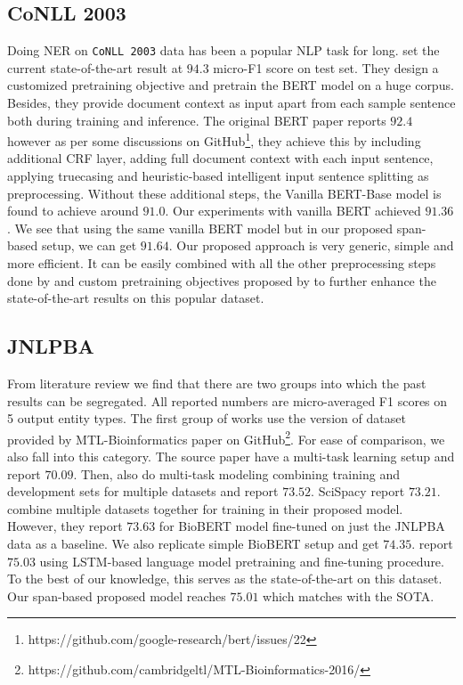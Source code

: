 \subsection{CoNLL 2003}
Doing NER on \texttt{CoNLL 2003} data has been a popular NLP task for long. \cite{yamada2020luke} set the current state-of-the-art result at $94.3$ micro-F1 score on test  set. They design a customized pretraining objective and pretrain the BERT model on a huge corpus. Besides, they provide document context as input apart from each sample sentence both during training and inference. The original BERT paper\cite{devlin2018bert} reports $92.4$ however as per some discussions on GitHub\footnote{https://github.com/google-research/bert/issues/22}, they achieve this by including additional CRF layer, adding full document context with each input sentence, applying truecasing and heuristic-based intelligent input sentence splitting as preprocessing. Without these additional steps, the Vanilla BERT-Base model is found to achieve around $91.0$. Our experiments with vanilla BERT achieved $91.36$. We see that using the same vanilla BERT model but in our proposed span-based setup, we can get $91.64$. Our proposed approach is very generic, simple and more efficient. It can be easily combined with all the other preprocessing steps done by \cite{devlin2018bert} and custom pretraining objectives proposed by \cite{yamada2020luke} to further enhance the state-of-the-art results on this popular dataset.

\subsection{JNLPBA}
From literature review we find that there are two groups into which the past results can be segregated. All reported numbers are micro-averaged F1 scores on 5 output entity types. The first group of works use the version of dataset provided by MTL-Bioinformatics\cite{crichton2017neural} paper on GitHub\footnote{https://github.com/cambridgeltl/MTL-Bioinformatics-2016/}. For ease of comparison, we also fall into this category. The source paper\cite{crichton2017neural} have a multi-task learning setup and report $70.09$. Then, \cite{wang2019cross} also do multi-task modeling combining training and development sets for multiple datasets and report $73.52$. SciSpacy\cite{neumann2019scispacy} report $73.21$. \cite{banerjee2019knowledge} combine multiple datasets together for training in their proposed model. However, they report $73.63$ for BioBERT model fine-tuned on just the JNLPBA data as a baseline. We also replicate simple BioBERT setup and get $74.35$. \cite{sachan2018effective} report $75.03$ using LSTM-based language model pretraining and fine-tuning procedure. To the best of our knowledge, this serves as the state-of-the-art on this dataset. Our span-based proposed model reaches $75.01$ which matches with the SOTA.

